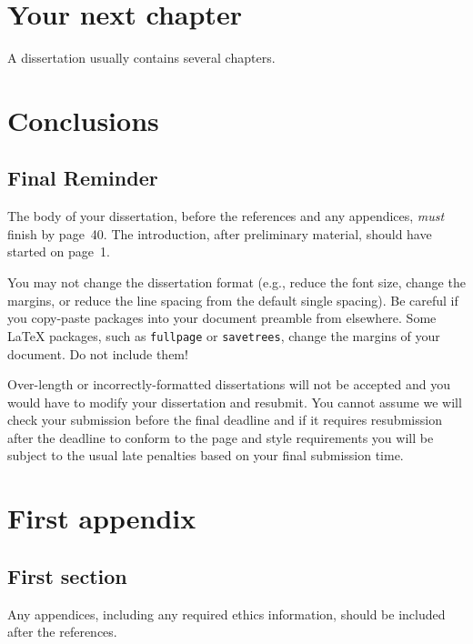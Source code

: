 \documentclass[logo,bsc,singlespacing,parskip]{infthesis}
\begin{document}
\chapter{Your next chapter}

A dissertation usually contains several chapters.

\chapter{Conclusions}

\section{Final Reminder}

The body of your dissertation, before the references and any appendices,
\emph{must} finish by page~40. The introduction, after preliminary material,
should have started on page~1.

You may not change the dissertation format (e.g., reduce the font size, change
the margins, or reduce the line spacing from the default single spacing). Be
careful if you copy-paste packages into your document preamble from elsewhere.
Some \LaTeX{} packages, such as \texttt{fullpage} or \texttt{savetrees}, change
the margins of your document. Do not include them!

Over-length or incorrectly-formatted dissertations will not be accepted and you
would have to modify your dissertation and resubmit. You cannot assume we will
check your submission before the final deadline and if it requires resubmission
after the deadline to conform to the page and style requirements you will be
subject to the usual late penalties based on your final submission time.

% 




\appendix

\chapter{First appendix}

\section{First section}

Any appendices, including any required ethics information, should be included
after the references.
\end{document}
